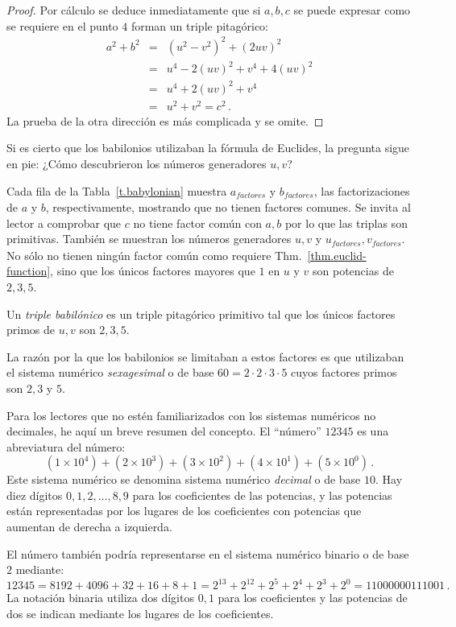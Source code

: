 \begin{proof}
Por cálculo se deduce inmediatamente que si $ {a,b,c}$ se puede expresar como se requiere en el punto $4$ forman un triple pitagórico:
\begin{eqnarray*}
a^2+b^2&=&(u^2-v^2)^2 + (2uv)^2\\
&=& u^4-2(uv)^2+v^4+4(uv)^2\\
&=&u^4+2(uv)^2+v^4\\
&=&u^2+v^2=c^2\,.
\end{eqnarray*}
La prueba de la otra dirección es más complicada y se omite.
\end{proof}
Si es cierto que los babilonios utilizaban la fórmula de Euclides, la pregunta sigue en pie: ¿Cómo descubrieron los números generadores $u,v$?

Cada fila de la Tabla~\ref{t.babylonian} muestra $a_{\textit{factores}}$ y $b_{\textit{factores}}$, las factorizaciones de $a$ y $b$, respectivamente, mostrando que no tienen factores comunes. Se invita al lector a comprobar que $c$ no tiene factor común con $a,b$ por lo que las triplas son primitivas. También se muestran los números generadores $u,v$ y $u_{\textit{factores}}, v_{\textit{factores}}$. No sólo no tienen ningún factor común como requiere Thm.~\ref{thm.euclid-function}, sino que los únicos factores mayores que $1$ en $u$ y $v$ son potencias de $2,3,5$.
\begin{definition}
Un \emph{triple babilónico} es un triple pitagórico primitivo tal que los únicos factores primos de $u,v$ son $2,3,5$.
\end{definition}
La razón por la que los babilonios se limitaban a estos factores es que utilizaban el sistema numérico \emph{sexagesimal} o de base $60=2\cdot 2\cdot 3\cdot 5$ cuyos factores primos son $2,3$ y $5$.

Para los lectores que no estén familiarizados con los sistemas numéricos no decimales, he aquí un breve resumen del concepto. El ``número'' $12345$ es una abreviatura del número:
\[
(1\times 10^4) + (2\times 10^3) + (3\times 10^2) + (4\times 10^1) + (5\times 10^0)\,.
\]
Este sistema numérico se denomina sistema numérico \emph{decimal} o de base $10$. Hay diez dígitos $0,1,2,\ldots,8,9$ para los coeficientes de las potencias, y las potencias están representadas por los lugares de los coeficientes con potencias que aumentan de derecha a izquierda. 

El número también podría representarse en el sistema numérico binario o de base $2$ mediante:
\[
12345=8192 + 4096 + 32+16+8+1=
2^{13} + 2^{12} + 2^{5} + 2^{4} + 2^{3} + 2^0=11000000111001\,.
\]
La notación binaria utiliza dos dígitos $0,1$ para los coeficientes y las potencias de dos se indican mediante los lugares de los coeficientes.

